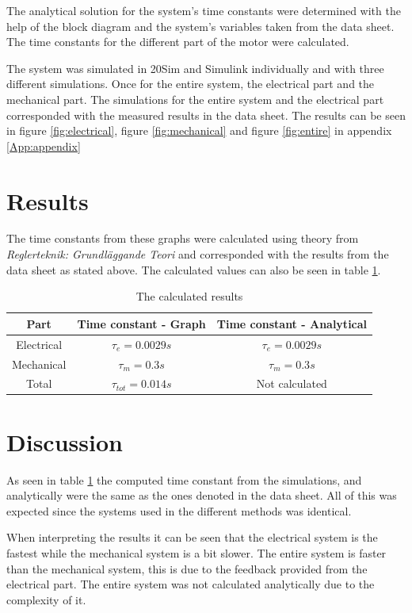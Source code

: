 \documentclass[12pt,a4paper]{article}
\begin{document}
The analytical solution for the system's time constants were determined with the help of the block diagram and the system's variables taken from the data sheet. The time constants for the different part of the motor were calculated.

The system was simulated in 20Sim and Simulink individually and with three different simulations. Once for the entire system, the electrical part and the mechanical part. The simulations for the entire system and the electrical part corresponded with the measured results in the data sheet. The results can be seen in figure \ref{fig:electrical}, figure \ref{fig:mechanical} and figure \ref{fig:entire} in appendix \ref{App:appendix}

\section{Results}
The time constants from these graphs were calculated using theory from \textit{Reglerteknik: Grundläggande Teori} \cite{regler} and corresponded with the results from the data sheet as stated above. The calculated values can also be seen in table \ref{table:results}.

\begin{table}[ht!]
\caption{\label{table:results}The calculated results}
\begin{center}
\begin{tabular}{ |c|c|c| }
 \hline
 \textbf{Part} & \textbf{Time constant - Graph} & \textbf{Time constant - Analytical} \\
 \hline
 Electrical & $\tau_{e} = 0.0029 s$ & $\tau_{e} = 0.0029 s$ \\
 Mechanical & $\tau_{m} = 0.3 s$ & $\tau_{m} = 0.3 s$\\
 Total & $\tau_{tot} = 0.014 s$ & Not calculated\\
 \hline
\end{tabular}
\end{center}
\end{table}
\section{Discussion}
As seen in table \ref{table:results} the computed time constant from the simulations, and analytically were the same as the ones denoted in the data sheet. All of this was expected since the systems used in the different methods was identical.

When interpreting the results it can be seen that the electrical system is the fastest while the mechanical system is a bit slower. The entire system is faster than the mechanical system, this is due to the feedback provided from the electrical part. The entire system was not calculated analytically due to the complexity of it.
\end{document}
